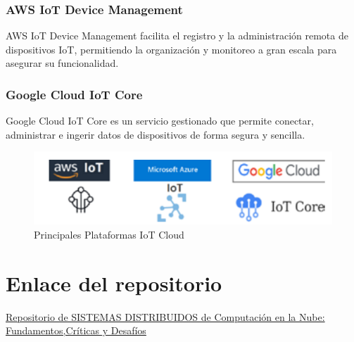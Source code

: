 \documentclass{article}
\begin{document}
\subsubsection{AWS IoT Device Management}
AWS IoT Device Management facilita el registro y la administración remota de dispositivos IoT, permitiendo la organización y monitoreo a gran escala para asegurar su funcionalidad.

\subsubsection{Google Cloud IoT Core}
Google Cloud IoT Core es un servicio gestionado que permite conectar, administrar e ingerir datos de dispositivos de forma segura y sencilla.

\begin{figure}[H] %
    \centering
    \includegraphics[width=0.65\linewidth]{Captura de pantalla 2024-10-18 230908.png}
    \caption{\label{fig:frog} Principales Plataformas IoT Cloud}
\end{figure}


\section{Enlace del repositorio}

\href{https://github.com/EvelynJazminVelazquez/SISTEMAS-DISTRIBUIDOS-ULEAM/tree/master/Computaci%C3%B3n%20en%20la%20Nube_%20Fundamentos%2C%20Cr%C3%ADticas%20y%20Desaf%C3%ADos}{Repositorio de SISTEMAS DISTRIBUIDOS de Computación en la Nube: Fundamentos,Críticas y Desafíos}
\end{document}
